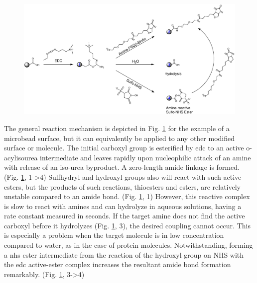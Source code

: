 \begin{figure}[htb!]
	\centering
	\includegraphics[width=\linewidth]{./Ressources/Chemistry/EDC-NHS.eps}
	\label{fig:chem:COOH-EDC-NHS}
\end{figure}
\clearpage
The general reaction mechanism is depicted in Fig. \ref{fig:chem:COOH-EDC-NHS} for the example of a microbead surface, but it can equivalently be applied to any other modified surface or molecule. The initial \gls{carboxyl} group is esterified by \gls{edc} to an active o-acylisourea intermediate and leaves rapidly upon nucleophilic attack of an amine with release of an iso-urea byproduct. A zero-length amide linkage is formed. (Fig. \ref{fig:chem:COOH-EDC-NHS}, 1->4) Sulfhydryl and hydroxyl groups also will react with such active esters, but the products of such reactions, thioesters and esters, are relatively unstable compared to an \gls{amide} bond. (Fig. \ref{fig:chem:COOH-EDC-NHS}, 1)\newline
However, this reactive complex is slow to react with amines and can hydrolyze in aqueous solutions, having a rate constant measured in seconds. If the target amine does not find the active \gls{carboxyl} before it hydrolyzes (Fig. \ref{fig:chem:COOH-EDC-NHS}, 3), the desired coupling cannot occur. This is especially a problem when the target molecule is in low concentration compared to water, as in the case of protein molecules. Notwithstanding, forming a \gls{nhs} ester intermediate from the reaction of the \gls{hydroxyl} group on NHS
with the \gls{edc} active-ester complex increases the resultant amide bond formation remarkably. (Fig. \ref{fig:chem:COOH-EDC-NHS}, 3->4) \cite{lit:chem:nhs2}

